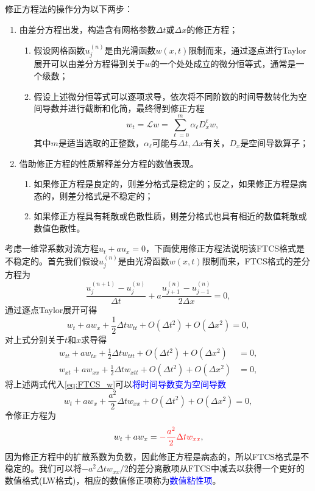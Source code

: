 \documentclass[a4paper,10pt]{ctexart}
\begin{document}
修正方程法的操作分为以下两步：
\begin{enumerate}
    \item 由差分方程出发，构造含有网格参数$ \Delta t $或$ \Delta x $的修正方程；
    \begin{enumerate}
        \item 假设网格函数$ u^{(n)}_j $是由光滑函数$ w(x,t) $限制而来，通过逐点进行Taylor展开可以由差分方程得到关于$ w $的一个处处成立的微分恒等式，通常是一个级数；
        \item 假设上述微分恒等式可以逐项求导，依次将不同阶数的时间导数转化为空间导数并进行截断和化简，最终得到修正方程
        \begin{equation}
            w_t = \mathcal{L}w = \sum_{\ell=0}^m \alpha_\ell D_x^\ell w,
        \end{equation}
        其中$ m $是适当选取的正整数，$ \alpha_\ell $可能与$ \Delta t,\Delta x $有关，$ D_x $是空间导数算子；
    \end{enumerate}
    \item 借助修正方程的性质解释差分方程的数值表现。
    \begin{enumerate}
        \item 如果修正方程是良定的，则差分格式是稳定的；反之，如果修正方程是病态的，则差分格式是不稳定的；
        \item 如果修正方程具有耗散或色散性质，则差分格式也具有相近的数值耗散或数值色散性。
    \end{enumerate}
\end{enumerate}
\begin{example}
    考虑一维常系数对流方程$ u_t + a u_x = 0 $，下面使用修正方程法说明该FTCS格式是不稳定的。首先我们假设$ u^{(n)}_j $是由光滑函数$ w(x,t) $限制而来，FTCS格式的差分方程为
    \[
        \frac{u^{(n+1)}_j - u^{(n)}_j}{\Delta t} + a \frac{u^{(n)}_{j+1} - u^{(n)}_{j-1}}{2\Delta x} = 0,
    \]
    通过逐点Taylor展开可得
    \begin{equation}\label{eq:FTCS_w}
        w_t + a w_x + \frac{1}{2}\Delta t w_{tt} + O(\Delta t^2) + O(\Delta x^2) = 0,
    \end{equation}
    对上式分别关于$ t $和$ x $求导得
    \[
        \begin{aligned}
            w_{tt} + a w_{tx} + \frac{1}{2}\Delta t w_{ttt} + O(\Delta t^2) + O(\Delta x^2) &= 0,\\
            w_{xt} + a w_{xx} + \frac{1}{2}\Delta t w_{xtt} + O(\Delta t^2) + O(\Delta x^2) &= 0,
        \end{aligned}
    \]
    将上述两式代入\eqref{eq:FTCS_w}可以\textcolor{blue}{将时间导数变为空间导数}
    \[
        w_t + a w_x + \frac{a^2}{2}\Delta t w_{xx} + O(\Delta t^2) + O(\Delta x^2) = 0,
    \]
    令修正方程为
    \[
        w_t + a w_x = \textcolor{red}{- \frac{a^2}{2}\Delta t w_{xx}},  
    \]
    因为修正方程中的扩散系数为负数，因此修正方程是病态的，所以FTCS格式是不稳定的。我们可以将$ - a^2 \Delta t w_{xx} / 2 $的差分离散项从FTCS中减去以获得一个更好的数值格式(LW格式)，相应的数值修正项称为\textcolor{blue}{数值粘性项}。
\end{example}
\end{document}

